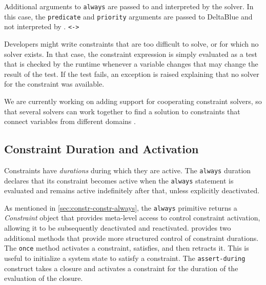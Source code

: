 Additional arguments to \lstinline{always} are passed to and
interpreted by the solver. In this case, the \lstinline{predicate} and
\lstinline{priority} arguments are passed to DeltaBlue and not
interpreted by \langname. \DIFaddbegin {}\lstinline{<->} \DIFaddend 

Developers might write constraints that are too difficult to solve, or
for which no solver exists. In that case, the constraint expression is
simply evaluated as a test that is checked by the runtime whenever a
variable changes that may change the result of the test. If the test
fails, an exception is raised explaining that no solver for the
constraint was available.

We are currently working on adding support for cooperating constraint
solvers, so that several solvers can work together to find a solution
to constraints that connect variables from different domains
\cite{borning-coop-solvers-2012}.

\subsection{Constraint Duration and Activation}
\label{sec:constraint-durations-and-activation}
Constraints have \emph{durations} during which they are active.  
The \lstinline{always} duration declares
that its constraint becomes active when the \lstinline{always}
statement is evaluated and remains active indefinitely after that,
unless explicitly deactivated.

As mentioned in \autoref{sec:constr-constr-always}, the
\lstinline{always} primitive returns a \emph{Constraint} object that
provides meta-level access to control constraint activation,
allowing it to be subsequently deactivated and reactivated.  \langname
provides two additional methods that provide more structured
control of constraint durations.
The \lstinline{once} method activates a constraint,
satisfies, and then retracts it. This is useful to initialize a system
state to satisfy a constraint. The \lstinline{assert-during} construct
takes a closure and activates a constraint for the duration of the
evaluation of the closure.


